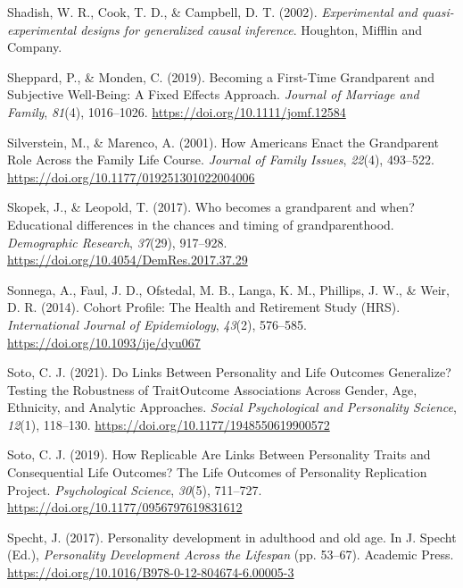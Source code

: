 \documentclass[
  english,
  man, noextraspace]{apa7}
\begin{document}
\leavevmode\hypertarget{ref-shadishExperimentalQuasiexperimentalDesigns2002}{}%
Shadish, W. R., Cook, T. D., \& Campbell, D. T. (2002). \emph{Experimental and quasi-experimental designs for generalized causal inference}. Houghton, Mifflin and Company.

\leavevmode\hypertarget{ref-sheppardBecomingFirstTimeGrandparent2019}{}%
Sheppard, P., \& Monden, C. (2019). Becoming a First-Time Grandparent and Subjective Well-Being: A Fixed Effects Approach. \emph{Journal of Marriage and Family}, \emph{81}(4), 1016--1026. \url{https://doi.org/10.1111/jomf.12584}

\leavevmode\hypertarget{ref-silversteinHowAmericansEnact2001}{}%
Silverstein, M., \& Marenco, A. (2001). How Americans Enact the Grandparent Role Across the Family Life Course. \emph{Journal of Family Issues}, \emph{22}(4), 493--522. \url{https://doi.org/10.1177/019251301022004006}

\leavevmode\hypertarget{ref-skopekWhoBecomesGrandparent2017}{}%
Skopek, J., \& Leopold, T. (2017). Who becomes a grandparent and when? Educational differences in the chances and timing of grandparenthood. \emph{Demographic Research}, \emph{37}(29), 917--928. \url{https://doi.org/10.4054/DemRes.2017.37.29}

\leavevmode\hypertarget{ref-sonnegaCohortProfileHealth2014}{}%
Sonnega, A., Faul, J. D., Ofstedal, M. B., Langa, K. M., Phillips, J. W., \& Weir, D. R. (2014). Cohort Profile: The Health and Retirement Study (HRS). \emph{International Journal of Epidemiology}, \emph{43}(2), 576--585. \url{https://doi.org/10.1093/ije/dyu067}

\leavevmode\hypertarget{ref-sotoLinksPersonalityLife2021}{}%
Soto, C. J. (2021). Do Links Between Personality and Life Outcomes Generalize? Testing the Robustness of TraitOutcome Associations Across Gender, Age, Ethnicity, and Analytic Approaches. \emph{Social Psychological and Personality Science}, \emph{12}(1), 118--130. \url{https://doi.org/10.1177/1948550619900572}

\leavevmode\hypertarget{ref-sotoHowReplicableAre2019}{}%
Soto, C. J. (2019). How Replicable Are Links Between Personality Traits and Consequential Life Outcomes? The Life Outcomes of Personality Replication Project. \emph{Psychological Science}, \emph{30}(5), 711--727. \url{https://doi.org/10.1177/0956797619831612}

\leavevmode\hypertarget{ref-spechtPersonalityDevelopmentAdulthood2017}{}%
Specht, J. (2017). Personality development in adulthood and old age. In J. Specht (Ed.), \emph{Personality Development Across the Lifespan} (pp. 53--67). Academic Press. \url{https://doi.org/10.1016/B978-0-12-804674-6.00005-3}
\end{document}
